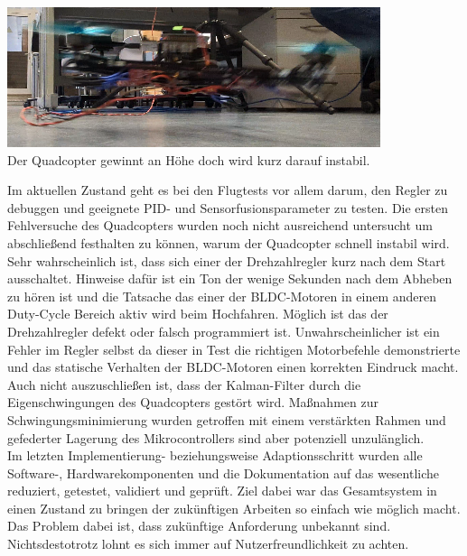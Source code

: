 \begin{center}
	\includegraphics[scale=0.85]{../images/0075 Flugtest.png}{\\Der Quadcopter gewinnt an Höhe doch wird kurz darauf instabil.}
\end{center}
Im aktuellen Zustand geht es bei den Flugtests vor allem darum, den Regler zu debuggen und geeignete PID- und Sensorfusionsparameter zu testen. Die ersten Fehlversuche des Quadcopters wurden noch nicht ausreichend untersucht um abschließend festhalten zu können, warum der Quadcopter schnell instabil wird. Sehr wahrscheinlich ist, dass sich einer der Drehzahlregler kurz nach dem Start ausschaltet. Hinweise dafür ist ein Ton der wenige Sekunden nach dem Abheben zu hören ist und die Tatsache das einer der BLDC-Motoren in einem anderen Duty-Cycle Bereich aktiv wird beim Hochfahren. Möglich ist das der Drehzahlregler defekt oder falsch programmiert ist. Unwahrscheinlicher ist ein Fehler im Regler selbst da dieser in Test die richtigen Motorbefehle demonstrierte und das statische Verhalten der BLDC-Motoren einen korrekten Eindruck macht. Auch nicht auszuschließen ist, dass der Kalman-Filter durch die Eigenschwingungen des Quadcopters gestört wird. Maßnahmen zur Schwingungsminimierung wurden getroffen mit einem verstärkten Rahmen und gefederter Lagerung des Mikrocontrollers sind aber potenziell unzulänglich.\\
Im letzten Implementierung- beziehungsweise Adaptionsschritt wurden alle Software-, Hardwarekomponenten und die Dokumentation auf das wesentliche reduziert, getestet, validiert und geprüft.
Ziel dabei war das Gesamtsystem in einen Zustand zu bringen der zukünftigen Arbeiten so einfach wie möglich macht. Das Problem dabei ist, dass zukünftige Anforderung unbekannt sind. Nichtsdestotrotz lohnt es sich immer auf Nutzerfreundlichkeit zu achten.